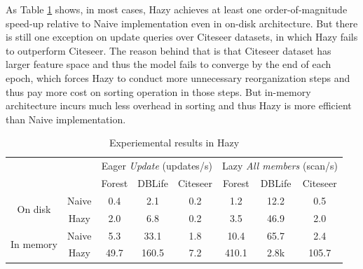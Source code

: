 As Table \ref{tab:hazy_exp} shows, in most cases, Hazy achieves at least one order-of-magnitude speed-up relative to Naive implementation even in on-disk architecture. But there is still one exception on update queries over Citeseer datasets, in which Hazy fails to outperform Citeseer. The reason behind that is that Citeseer dataset has larger feature space and thus the model fails to converge by the end of each epoch, which forces Hazy to conduct more unnecessary reorganization steps and thus pay more cost on sorting operation in those steps. But in-memory architecture incurs much less overhead in sorting and thus Hazy is more efficient than Naive implementation.


\begin{table}[h]
    \centering
    \begin{tabular}{|c|c|c|c|c|c|c|c|}\hline
        && \multicolumn{3}{|c|}{Eager {\em Update} (updates/s)}&\multicolumn{3}{|c|}{Lazy {\em All members} (scan/s)}  \\\hhline{~~------}
        &&Forest&DBLife & Citeseer & Forest & DBLife & Citeseer\\\hline
    \multirow{2}{*}{On disk}&Naive&0.4 & 2.1 & 0.2 & 1.2 & 12.2 & 0.5\\\hhline{~-------}
    &Hazy&2.0 & 6.8 & 0.2 & 3.5 & 46.9 & 2.0\\\hline
    \multirow{2}{*}{In memory}&Naive&5.3 & 33.1 & 1.8 & 10.4 & 65.7 & 2.4\\\hhline{~-------}
    &Hazy&49.7 & 160.5 & 7.2 & 410.1 & 2.8k & 105.7\\\hline
    \end{tabular}
    \caption{Experiemental results in Hazy}
    \label{tab:hazy_exp}
\end{table}


